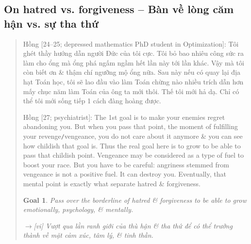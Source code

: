 \documentclass[12pt,twoside]{book}
\newtheorem{goal}{Goal}
\begin{document}
\subsection{On hatred vs. forgiveness -- Bàn về lòng căm hận vs. sự tha thứ}

\begin{quote}
	{\sf Hồng [24--25; depressed mathematics PhD student in Optimization]}: Tôi ghét thầy hướng dẫn người Đức của tôi cực. Tôi bỏ bao nhiêu công sức ra làm cho ổng mà ổng phá ngấm ngầm hết lần này tới lần khác. Vậy mà tôi còn biết ơn \& thậm chí ngưỡng mộ ổng nữa. Sau này nếu có quay lại địa hạt Toán học, tôi sẽ lao đầu vào làm Toán chừng nào nhiều trích dẫn hơn mấy chục năm làm Toán của ông ta mới thôi. Thế tôi mới hả dạ. Chỉ có thể tôi mới sống tiếp 1 cách đàng hoàng được.
	
	{\sf Hồng [27; psychiatrist]}: The 1st goal is to make your enemies regret abandoning you. But when you pass that point, the moment of fulfilling your revenge{\tt/}vengeance, you do not care about it anymore \& you can see how childish that goal is. Thus the real goal here is to grow to be able to pass that childish point. Vengeance may be considered as a type of fuel to boost your race. But you have to be careful: angriness stemmed from vengeance is not a positive fuel. It can destroy you. Eventually, that mental point is exactly what separate hatred \& forgiveness.
	
	\begin{goal}
		Pass over the borderline of hatred \& forgiveness to be able to grow emotionally, psychology, \& mentally.
		
		{\sf[en]$\to$[vi]} Vượt qua lằn ranh giới của thù hận \& tha thứ để có thể trưởng thành về mặt cảm xúc, tâm lý, \& tinh thần.
	\end{goal}
	

\end{quote}
\end{document}
